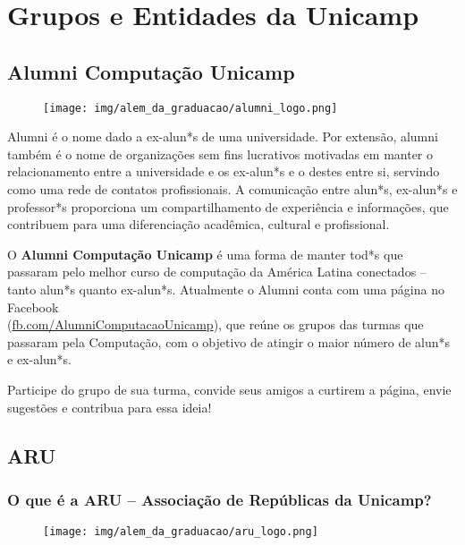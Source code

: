 
\section{Grupos e Entidades da Unicamp}

\subsection{Alumni Computação Unicamp}

\begin{figure}[H]
    \centering
    \texttt{[image: img/alem\_da\_graduacao/alumni\_logo.png]}
\end{figure}

Alumni é o nome dado a ex-alun*s de uma universidade. Por extensão, alumni
também é o nome de organizações sem fins lucrativos motivadas em manter o
relacionamento entre a universidade e os ex-alun*s e o destes entre si, servindo
como uma rede de contatos profissionais. A comunicação entre alun*s, ex-alun*s e
professor*s proporciona um compartilhamento de experiência e informações, que
contribuem para uma diferenciação acadêmica, cultural e profissional.

O \textbf{Alumni Computação Unicamp} é uma forma de manter tod*s que passaram
pelo melhor curso de computação da América Latina conectados -- tanto alun*s
quanto ex-alun*s. Atualmente o Alumni conta com uma página no Facebook
\\(\url{fb.com/AlumniComputacaoUnicamp}), que reúne os grupos das turmas que
passaram pela Computação, com o objetivo de atingir o maior número de alun*s e
ex-alun*s.

Participe do grupo de sua turma, convide seus amigos a curtirem a página, envie
sugestões e contribua para essa ideia!

\subsection{ARU}

\subsubsection{O que é a ARU – Associação de Repúblicas da Unicamp?}

\begin{figure}[H]
    \centering
    \texttt{[image: img/alem\_da\_graduacao/aru\_logo.png]}
\end{figure}

